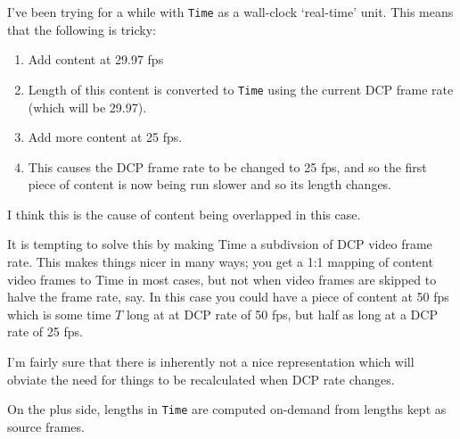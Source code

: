 \documentclass{article}
\begin{document}
I've been trying for a while with \texttt{Time} as a wall-clock
`real-time' unit.  This means that the following is tricky:

\begin{enumerate}
\item Add content at 29.97 fps
\item Length of this content is converted to \texttt{Time} using the
  current DCP frame rate (which will be 29.97).
\item Add more content at 25 fps.
\item This causes the DCP frame rate to be changed to 25 fps, and so
  the first piece of content is now being run slower and so its length
  changes.
\end{enumerate}

I think this is the cause of content being overlapped in this case.

It is tempting to solve this by making Time a subdivsion of DCP video
frame rate.  This makes things nicer in many ways; you get a 1:1
mapping of content video frames to Time in most cases, but not when
video frames are skipped to halve the frame rate, say.  In this case
you could have a piece of content at 50 fps which is some time $T$
long at at DCP rate of 50 fps, but half as long at a DCP rate of 25 fps.

I'm fairly sure that there is inherently not a nice representation which
will obviate the need for things to be recalculated when DCP rate changes.

On the plus side, lengths in \texttt{Time} are computed on-demand from
lengths kept as source frames.
\end{document}
